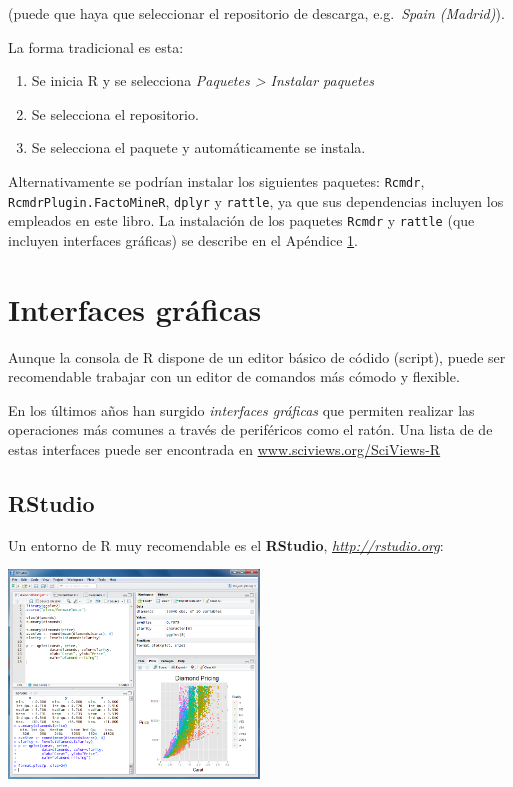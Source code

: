 \documentclass[]{book}
\begin{document}
(puede que haya que seleccionar el repositorio de descarga, e.g.~\emph{Spain
(Madrid)}).

La forma tradicional es esta:

\begin{enumerate}
\def\labelenumi{\arabic{enumi}.}
\item
  Se inicia R y se selecciona \emph{Paquetes \textgreater{} Instalar paquetes}
\item
  Se selecciona el repositorio.
\item
  Se selecciona el paquete y automáticamente se instala.
\end{enumerate}

Alternativamente se podrían instalar los siguientes paquetes: \texttt{Rcmdr},
\texttt{RcmdrPlugin.FactoMineR}, \texttt{dplyr} y \texttt{rattle}, ya que sus dependencias
incluyen los empleados en este libro.
La instalación de los paquetes \texttt{Rcmdr} y \texttt{rattle} (que incluyen interfaces gráficas) se describe
en el Apéndice \ref{interfaces}.

\hypertarget{interfaces}{%
\chapter{Interfaces gráficas}\label{interfaces}}

Aunque la consola de R dispone de un editor básico de códido (script),
puede ser recomendable trabajar con un editor de comandos más cómodo y
flexible.

En los últimos años han surgido \emph{interfaces gráficas} que permiten
realizar las operaciones más comunes a través de periféricos como el
ratón. Una lista de de estas interfaces puede ser encontrada en
\url{www.sciviews.org/SciViews-R}

\hypertarget{rstudio}{%
\section{RStudio}\label{rstudio}}

Un entorno de R muy recomendable es el \textbf{RStudio},
\href{http://rstudio.org}{\emph{http://rstudio.org}}:

\includegraphics[width=0.5\textwidth,height=\textheight]{figuras/RStudio-screenshot.png}
\end{document}
